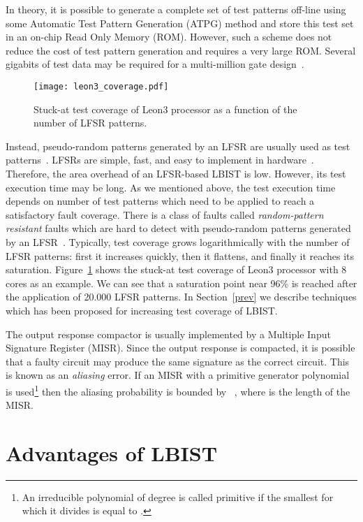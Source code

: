 \documentclass[conference]{IEEEtran}
\begin{document}
In theory, it is possible to generate a complete set of test patterns off-line using some Automatic Test
Pattern Generation (ATPG) method and store this test set in an on-chip Read Only Memory (ROM). However, such a
scheme does not reduce the cost of test pattern generation and requires a very large ROM. Several gigabits of
test data may be required for a multi-million gate design~\cite{HeF99}. 


\begin{figure}[t]
\begin{center}
\texttt{[image: leon3\_coverage.pdf]}
\caption{Stuck-at test coverage of Leon3 processor as a function of the number of LFSR patterns.}\label{leon_cov}
\end{center}
\end{figure}

Instead, pseudo-random patterns generated by
an LFSR are usually used as test patterns~\cite{McMMW88}. 
LFSRs are simple, fast, and easy to implement in hardware~\cite{Golomb_book}.
Therefore, the area overhead of an LFSR-based LBIST is
low. However, its test execution time may be long. As we mentioned above, the test execution time depends on number of test patterns which need to be applied to reach a satisfactory fault coverage. There is a class of faults called {\em random-pattern resistant} faults which are hard to detect with pseudo-random patterns generated by an LFSR~\cite{Da98}. 
Typically, test coverage grows logarithmically with the number of LFSR patterns: 
first it increases quickly, then it flattens, and finally it reaches its saturation. 
Figure~\ref{leon_cov} shows the stuck-at test coverage of Leon3 processor with 8 cores as an example. 
We can see that a saturation point near 96\% is reached after the application of 20.000 LFSR patterns.
In Section~\ref{prev} we describe techniques which has been proposed for increasing test coverage of LBIST.

The output response compactor is usually implemented by a  
Multiple Input Signature Register  (MISR). Since the output response is compacted, it is possible that a faulty circuit may produce the same signature as the correct circuit. This is known as an {\em aliasing} error. If an MISR with a primitive generator polynomial is used\footnote{An irreducible polynomial of degree  is called primitive if the smallest  for which it divides  is equal to \cite{Golomb_book}.} then the aliasing probability is bounded by ~\cite{DaOFE90}, where  is the length of the MISR.

\section{Advantages of LBIST} \label{adv}
\end{document}
